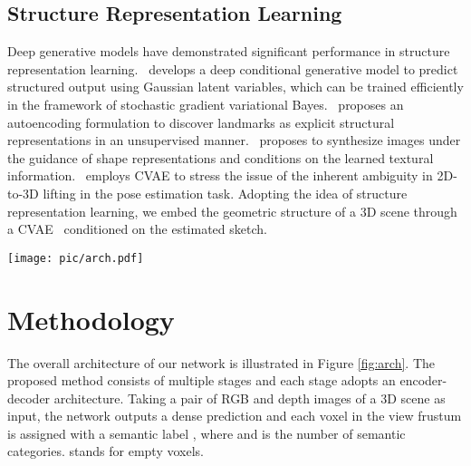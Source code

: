\documentclass[10pt,twocolumn,letterpaper]{article}
\begin{document}
\subsection{Structure Representation Learning}
Deep generative models have demonstrated significant performance in structure representation learning.~\cite{sohn2015learning} develops a deep conditional generative model to predict structured output using Gaussian latent variables, which can be trained efficiently in the framework of stochastic gradient variational Bayes.~\cite{zhang2018unsupervised} proposes an autoencoding formulation to discover landmarks as explicit structural representations in an unsupervised manner.~\cite{esser2018variational} proposes to synthesize images under the guidance of shape representations and conditions on the learned textural information.~\cite{sharma2019monocular} employs CVAE to stress the issue of the inherent ambiguity in 2D-to-3D lifting in the pose estimation task.
Adopting the idea of structure representation learning, we embed the geometric structure of a 3D scene through a CVAE~\cite{sohn2015learning} conditioned on the estimated sketch.

\begin{figure*}[t!]
\centering
\texttt{[image: pic/arch.pdf]}
\caption{\small{\textbf{Overview of our network}. We first generate structure prior information from the TSDF input and use CVAE to refine the prediction. Then the prior information will be passed to the RGB-branch to predict occupancy and object labels for each voxel in the view frustum. The convolution parameters are shown as (kernel size, dilation). The DDR parameters are shown as (dilation, downsample rate). The Deconvolution parameters are shown as (kernel size, upsample rate).}}
\vspace{-2mm}
\label{fig:arch}
\end{figure*}


\section{Methodology}

The overall architecture of our network is illustrated in Figure \ref{fig:arch}. The proposed method consists of multiple stages and each stage adopts an encoder-decoder architecture. Taking a pair of RGB and depth images of a 3D scene as input, the network outputs a  dense prediction and each voxel in the view frustum is assigned with a semantic label , where  and  is the number of semantic categories.  stands for empty voxels.
\end{document}
